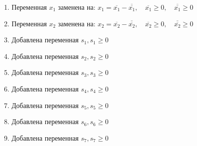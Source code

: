 \begin{enumerate}
\item Переменная $x_1$ заменена на: $x_1 = \overline{x_1} - \overline{\overline{x_1}}, \quad \overline{x_1} \geq 0, \quad  \overline{\overline{x_1}} \geq 0$
\item Переменная $x_2$ заменена на: $x_2 = \overline{x_2} - \overline{\overline{x_2}}, \quad \overline{x_2} \geq 0, \quad  \overline{\overline{x_2}} \geq 0$
\item Добавлена переменная $s_1,  s_1 \geq 0$
\item Добавлена переменная $s_2,  s_2 \geq 0$
\item Добавлена переменная $s_3,  s_3 \geq 0$
\item Добавлена переменная $s_4,  s_4 \geq 0$
\item Добавлена переменная $s_5,  s_5 \geq 0$
\item Добавлена переменная $s_6,  s_6 \geq 0$
\item Добавлена переменная $s_7,  s_7 \geq 0$
\end{enumerate}
